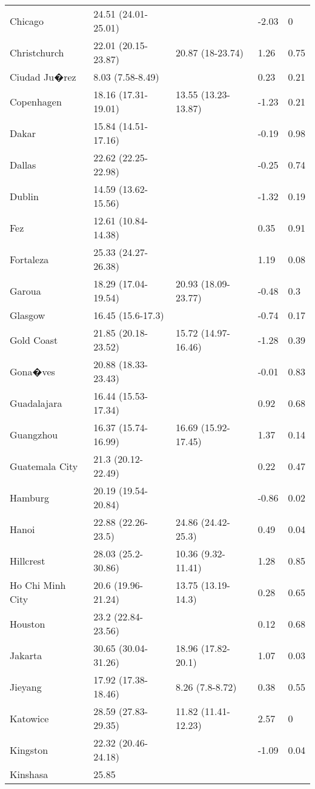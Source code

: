 \begin{longtable}{lllll}
  Chicago & 24.51
 (24.01-25.01) &  & -2.03 & 0 \\ 
  Christchurch & 22.01
 (20.15-23.87) & 20.87
 (18-23.74) & 1.26 & 0.75 \\ 
  Ciudad Ju�rez & 8.03
 (7.58-8.49) &  & 0.23 & 0.21 \\ 
  Copenhagen & 18.16
 (17.31-19.01) & 13.55
 (13.23-13.87) & -1.23 & 0.21 \\ 
  Dakar & 15.84
 (14.51-17.16) &  & -0.19 & 0.98 \\ 
  Dallas & 22.62
 (22.25-22.98) &  & -0.25 & 0.74 \\ 
  Dublin & 14.59
 (13.62-15.56) &  & -1.32 & 0.19 \\ 
  Fez & 12.61
 (10.84-14.38) &  & 0.35 & 0.91 \\ 
  Fortaleza & 25.33
 (24.27-26.38) &  & 1.19 & 0.08 \\ 
  Garoua & 18.29
 (17.04-19.54) & 20.93
 (18.09-23.77) & -0.48 & 0.3 \\ 
  Glasgow & 16.45
 (15.6-17.3) &  & -0.74 & 0.17 \\ 
  Gold Coast & 21.85
 (20.18-23.52) & 15.72
 (14.97-16.46) & -1.28 & 0.39 \\ 
  Gona�ves & 20.88
 (18.33-23.43) &  & -0.01 & 0.83 \\ 
  Guadalajara & 16.44
 (15.53-17.34) &  & 0.92 & 0.68 \\ 
  Guangzhou & 16.37
 (15.74-16.99) & 16.69
 (15.92-17.45) & 1.37 & 0.14 \\ 
  Guatemala City & 21.3
 (20.12-22.49) &  & 0.22 & 0.47 \\ 
  Hamburg & 20.19
 (19.54-20.84) &  & -0.86 & 0.02 \\ 
  Hanoi & 22.88
 (22.26-23.5) & 24.86
 (24.42-25.3) & 0.49 & 0.04 \\ 
  Hillcrest & 28.03
 (25.2-30.86) & 10.36
 (9.32-11.41) & 1.28 & 0.85 \\ 
  Ho Chi Minh City & 20.6
 (19.96-21.24) & 13.75
 (13.19-14.3) & 0.28 & 0.65 \\ 
  Houston & 23.2
 (22.84-23.56) &  & 0.12 & 0.68 \\ 
  Jakarta & 30.65
 (30.04-31.26) & 18.96
 (17.82-20.1) & 1.07 & 0.03 \\ 
  Jieyang & 17.92
 (17.38-18.46) & 8.26
 (7.8-8.72) & 0.38 & 0.55 \\ 
  Katowice & 28.59
 (27.83-29.35) & 11.82
 (11.41-12.23) & 2.57 & 0 \\ 
  Kingston & 22.32
 (20.46-24.18) &  & -1.09 & 0.04 \\ 
  Kinshasa & 25.85

\end{longtable}
